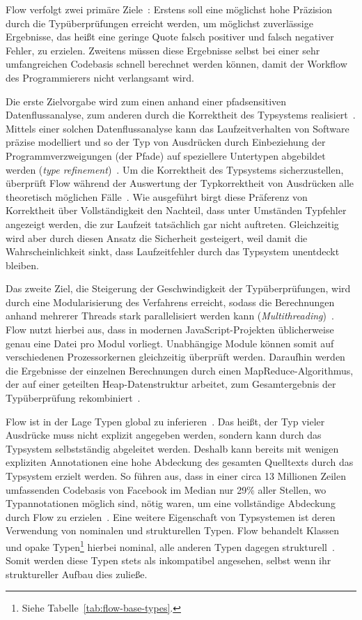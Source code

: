 Flow verfolgt zwei primäre Ziele~\autocite{FLOW:TYPE_SYSTEM}: Erstens soll eine möglichst hohe Präzision durch die Typüberprüfungen erreicht werden, um möglichst zuverlässige Ergebnisse, das heißt eine geringe Quote falsch positiver und falsch negativer Fehler, zu erzielen. Zweitens müssen diese Ergebnisse selbst bei einer sehr umfangreichen Codebasis schnell berechnet werden können, damit der Workflow des Programmierers nicht verlangsamt wird.

Die erste Zielvorgabe wird zum einen anhand einer pfadsensitiven Datenflussanalyse, zum anderen durch die Korrektheit des Typsystems realisiert~\autocite{FLOW:TYPE_SYSTEM}. Mittels einer solchen Datenflussanalyse kann das Laufzeitverhalten von Software präzise modelliert und so der Typ von Ausdrücken durch Einbeziehung der Programmverzweigungen (der Pfade) auf speziellere Untertypen abgebildet werden (\textit{type refinement})~\cites{WINTER:2013}[2]{FLOW:PAPER}.
Um die Korrektheit des Typsystems sicherzustellen, überprüft Flow während der Auswertung der Typkorrektheit von Ausdrücken alle theoretisch möglichen Fälle~\autocite{FLOW:TYPES_AND_EXPRESSIONS}. Wie ausgeführt birgt diese Präferenz von Korrektheit über Vollständigkeit den Nachteil, dass unter Umständen Typfehler angezeigt werden, die zur Laufzeit tatsächlich gar nicht auftreten. Gleichzeitig wird aber durch diesen Ansatz die Sicherheit gesteigert, weil damit die Wahrscheinlichkeit sinkt, dass Laufzeitfehler durch das Typsystem unentdeckt bleiben.

Das zweite Ziel, die Steigerung der Geschwindigkeit der Typüberprüfungen, wird durch eine Modularisierung des Verfahrens erreicht, sodass die Berechnungen anhand mehrerer Threads stark parallelisiert werden kann (\textit{Multithreading})~\autocite[4]{FLOW:PAPER}. Flow nutzt hierbei aus, dass in modernen JavaScript-Projekten üblicherweise genau eine Datei pro Modul vorliegt. Unabhängige Module können somit auf verschiedenen Prozessorkernen gleichzeitig überprüft werden. Daraufhin werden die Ergebnisse der einzelnen Berechnungen durch einen MapReduce-Algorithmus, der auf einer geteilten Heap-Datenstruktur arbeitet, zum Gesamtergebnis der Typüberprüfung rekombiniert~\autocite[22\psq]{FLOW:PAPER}.

Flow ist in der Lage Typen global zu inferieren~\autocite[25]{FLOW:PAPER}. Das heißt, der Typ vieler Ausdrücke muss nicht explizit angegeben werden, sondern kann durch das Typsystem selbstständig abgeleitet werden. Deshalb kann bereits mit wenigen expliziten Annotationen eine hohe Abdeckung des gesamten Quelltexts durch das Typsystem erzielt werden. So führen \citeauthor{FLOW:PAPER} aus, dass in einer circa 13 Millionen Zeilen umfassenden Codebasis von Facebook im Median nur 29\% aller Stellen, wo Typannotationen möglich sind, nötig waren, um eine vollständige Abdeckung durch Flow zu erzielen~\autocite[24]{FLOW:PAPER}. Eine weitere Eigenschaft von Typsystemen ist deren Verwendung von nominalen und strukturellen Typen. Flow behandelt Klassen und opake Typen\footnote{Siehe Tabelle~\ref{tab:flow-base-types}.} hierbei nominal, alle anderen Typen dagegen strukturell~\autocite{FLOW:NOMINAL_TYPES}. Somit werden diese Typen stets als inkompatibel angesehen, selbst wenn ihr struktureller Aufbau dies zuließe.


